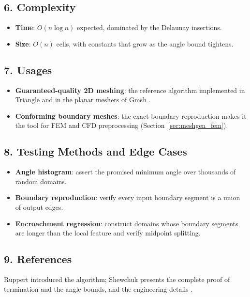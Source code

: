 \subsection{6. Complexity}

\begin{itemize}
\item \textbf{Time}: $O(n \log n)$ expected, dominated by the Delaunay
  insertions.
\item \textbf{Size}: $O(n)$ cells, with constants that grow as the angle
  bound tightens.
\end{itemize}

\subsection{7. Usages}

\begin{itemize}
\item \textbf{Guaranteed-quality 2D meshing}: the reference algorithm
  implemented in Triangle and in the planar meshers of Gmsh
  \cite{geuzaine2009,shewchuk2002}.
\item \textbf{Conforming boundary meshes}: the exact boundary reproduction
  makes it the tool for FEM and CFD preprocessing (Section~\ref{sec:meshgen_fem}).
\end{itemize}

\subsection{8. Testing Methods and Edge Cases}

\begin{itemize}
\item \textbf{Angle histogram}: assert the promised minimum angle over
  thousands of random domains.
\item \textbf{Boundary reproduction}: verify every input boundary segment is
  a union of output edges.
\item \textbf{Encroachment regression}: construct domains whose boundary
  segments are longer than the local feature and verify midpoint splitting.
\end{itemize}

\subsection{9. References}

Ruppert \cite{ruppert1995} introduced the algorithm; Shewchuk
\cite{shewchuk2002} presents the complete proof of termination and the
angle bounds, and the engineering details \cite{shewchuk1998}.

